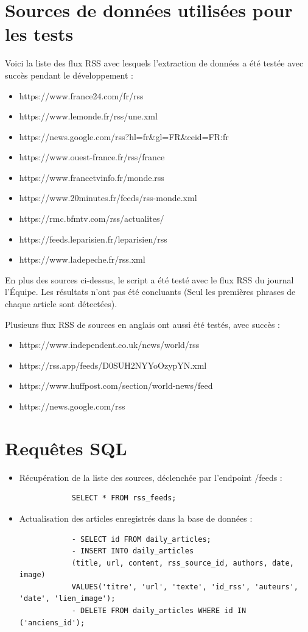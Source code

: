 \documentclass[french]{article}
\begin{document}
    \section*{Sources de données utilisées pour les tests}
    Voici la liste des flux RSS avec lesquels l'extraction de données a été testée avec succès pendant le développement :
    \begin{itemize}
        \item https://www.france24.com/fr/rss
        \item https://www.lemonde.fr/rss/une.xml
        \item https://news.google.com/rss?hl=fr\&gl=FR\&ceid=FR:fr
        \item https://www.ouest-france.fr/rss/france
        \item https://www.francetvinfo.fr/monde.rss
        \item https://www.20minutes.fr/feeds/rss-monde.xml
        \item https://rmc.bfmtv.com/rss/actualites/
        \item https://feeds.leparisien.fr/leparisien/rss
        \item https://www.ladepeche.fr/rss.xml
    \end{itemize}
    En plus des sources ci-dessus, le script a été testé avec le flux RSS du journal l'Équipe. Les résultats n'ont pas été concluants (Seul les premières phrases de chaque article sont détectées).
    
    Plusieurs flux RSS de sources en anglais ont aussi été testés, avec succès :
    \begin{itemize}
        \item https://www.independent.co.uk/news/world/rss
        \item https://rss.app/feeds/D0SUH2NYYoOzypYN.xml
        \item https://www.huffpost.com/section/world-news/feed
        \item https://news.google.com/rss
    \end{itemize}
    \section*{Requêtes SQL}
    \begin{itemize}
        \item Récupération de la liste des sources, déclenchée par l'endpoint /feeds : 
        \begin{verbatim}
            SELECT * FROM rss_feeds;
        \end{verbatim}
        \item Actualisation des articles enregistrés dans la base de données :
        \begin{verbatim}
            - SELECT id FROM daily_articles;
            - INSERT INTO daily_articles
            (title, url, content, rss_source_id, authors, date, image) 
            VALUES('titre', 'url', 'texte', 'id_rss', 'auteurs', 'date', 'lien_image');
            - DELETE FROM daily_articles WHERE id IN ('anciens_id');
        \end{verbatim}
    \end{itemize}
\end{document}
